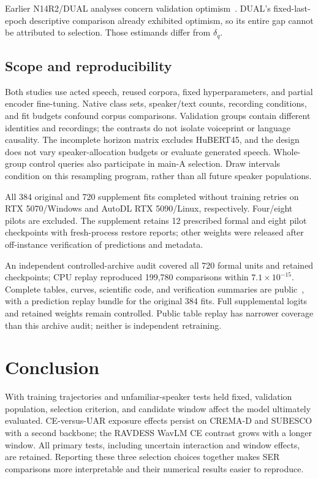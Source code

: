 \documentclass[letterpaper]{article}
\begin{document}
Earlier N14R2/DUAL analyses concern validation optimism~\cite{artifact}. DUAL's fixed-last-epoch descriptive comparison already exhibited optimism, so its entire gap cannot be attributed to selection. Those estimands differ from $\delta_q$.

\subsection{Scope and reproducibility}
Both studies use acted speech, reused corpora, fixed hyperparameters, and partial encoder fine-tuning. Native class sets, speaker/text counts, recording conditions, and fit budgets confound corpus comparisons. Validation groups contain different identities and recordings; the contrasts do not isolate voiceprint or language causality. The incomplete horizon matrix excludes HuBERT45, and the design does not vary speaker-allocation budgets or evaluate generated speech. Whole-group control queries also participate in main-A selection. Draw intervals condition on this resampling program, rather than all future speaker populations.

All 384 original and 720 supplement fits completed without training retries on RTX 5070/Windows and AutoDL RTX 5090/Linux, respectively. Four/eight pilots are excluded. The supplement retains 12 prescribed formal and eight pilot checkpoints with fresh-process restore reports; other weights were released after off-instance verification of predictions and metadata.

An independent controlled-archive audit covered all 720 formal units and retained checkpoints; CPU replay reproduced 199,780 comparisons within $7.1\times10^{-15}$. Complete tables, curves, scientific code, and verification summaries are public~\cite{artifact}, with a prediction replay bundle for the original 384 fits. Full supplemental logits and retained weights remain controlled. Public table replay has narrower coverage than this archive audit; neither is independent retraining.

\section{Conclusion}
With training trajectories and unfamiliar-speaker tests held fixed, validation population, selection criterion, and candidate window affect the model ultimately evaluated. CE-versus-UAR exposure effects persist on CREMA-D and SUBESCO with a second backbone; the RAVDESS WavLM CE contrast grows with a longer window. All primary tests, including uncertain interaction and window effects, are retained. Reporting these three selection choices together makes SER comparisons more interpretable and their numerical results easier to reproduce.
\end{document}
